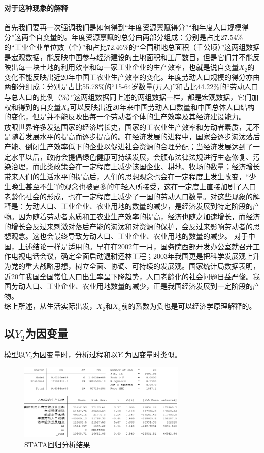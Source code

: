\documentclass[UTF8]{article}
\begin{document}
	\paragraph{对于这种现象的解释}首先我们要再一次强调我们是如何得到“年度资源禀赋得分”“和年度人口规模得分”这两个自变量的。年度资源禀赋的总分由两部分组成：分别是占比27.54\%的“工业企业单位数（个）”和占比72.46\%的“全国耕地总面积（千公顷）”这两组数据是宏观数据，能反映中国参与经济建设的土地面积和工厂数目，但是它们并不能反映出每一块土地的利用效率和每一家工业企业的生产效率，也就是说自变量$X_2$的变化不能反映出近20年中国工农业生产效率的变化。年度劳动人口规模的得分亦由两部分组成：分别是占比55.78\%的“15-64岁数量(万人)”和占比44.22\%的“劳动人口与总人口的比例（\%）”这两组数据同上述的两组数据一样，都是宏观数据，它们加权和得到的自变量$X_4$可以反映出近20年来中国劳动人口数量和中国总体人口结构的变化，但是并不能反映出每一个劳动者个体的生产效率及其经济建设能力。
	\\\indent 
	放眼世界许多发达国家的经济增长史，国家的工农业生产效率和劳动者素质，无不是随着发展水平的提高而逐步提高的。在经济发展的进程中，国家会逐步淘汰落后产能、倒闭生产效率低下的企业以促进社会资源的合理分配；当经济发展达到了一定水平以后，政府会提倡绿色健康可持续发展，会颁布法律法规进行生态修复、污染治理，而此类政策会在一定程度上减少该国企业、耕地、牧场的数量；经济增长带来人们的生活水平的提高后，人们的思想观念也会在一定程度上发生改变，“少生晚生甚至不生”的观念也被更多的年轻人所接受，这在一定度上直接加剧了人口老龄化社会的形成，也在一定程度上减少了一国的劳动人口数量。对这些现象的解释是：劳动人口、工业企业、农业用地的数量的减少，是经济发展到特定阶段的产物。因为随着劳动者素质和工农业生产效率的提高，经济也随之加速增长，而经济的增长会反过来刺激对落后产能的淘汰和对资源的保护，会反过来影响劳动者的思想观念。这也会最终导致劳动人口、工业企业、农业用地的数量的减少。
	对于中国，上述结论一样是适用的。早在在2002年一月，国务院西部开发办公室就召开工作电视电话会议，确定全面启动退耕还林工程；2003年我国更是把科学发展观上升为党的重大战略思想，树立全面、协调、可持续的发展观。国家统计局数据表明，近20年我国全国常住人口出生率呈下降趋势，人口老龄化的社会问题日益严俊。我国劳动人口、工业企业、农业用地数量的减少，正是我国经济发展到一定阶段的产物。
	\\\indent 
	综上所述，从生活实际出发，$X_2$和$X_4$前的系数为负也是可以经济学原理解释的。
	\subsection{以$Y_2$为因变量}
	模型以$Y_2$为因变量时，分析过程和以$Y_1$为因变量时类似。
	\newpage
	\begin{figure}[htb]
	\centering
	\includegraphics[width=8cm]{pictures/nhjg3.png}
	\caption{STATA回归分析结果}
	\label{nhjg3}
	\end{figure}
\end{document}
